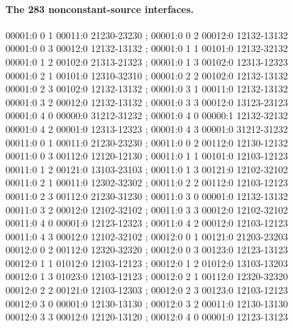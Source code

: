 \documentclass[11pt]{article}
\theoremstyle{remark}
\numberwithin{equation}{section}
\numberwithin{table}{section}
\begin{document}
\paragraph{The 283 nonconstant-source interfaces.}
\begingroup\scriptsize\ttfamily\begin{flushleft}
00001:0 0 1 00011:0 21230-23230 ; 00001:0 0 2 00012:0 12132-13132\\
00001:0 0 3 00012:0 12132-13132 ; 00001:0 1 1 00101:0 12132-32132\\
00001:0 1 2 00102:0 21313-21323 ; 00001:0 1 3 00102:0 12313-12323\\
00001:0 2 1 00101:0 12310-32310 ; 00001:0 2 2 00102:0 12132-13132\\
00001:0 2 3 00102:0 12132-13132 ; 00001:0 3 1 00011:0 12132-13132\\
00001:0 3 2 00012:0 12132-13132 ; 00001:0 3 3 00012:0 13123-23123\\
00001:0 4 0 00000:0 31212-31232 ; 00001:0 4 0 00000:1 12132-32132\\
00001:0 4 2 00001:0 12313-12323 ; 00001:0 4 3 00001:0 31212-31232\\
00011:0 0 1 00011:0 21230-23230 ; 00011:0 0 2 00112:0 12130-12132\\
00011:0 0 3 00112:0 12120-12130 ; 00011:0 1 1 00101:0 12103-12123\\
00011:0 1 2 00121:0 13103-23103 ; 00011:0 1 3 00121:0 12102-32102\\
00011:0 2 1 00011:0 12302-32302 ; 00011:0 2 2 00112:0 12103-12123\\
00011:0 2 3 00112:0 21230-31230 ; 00011:0 3 0 00001:0 12132-13132\\
00011:0 3 2 00012:0 12102-32102 ; 00011:0 3 3 00012:0 12102-32102\\
00011:0 4 0 00001:0 12123-12323 ; 00011:0 4 2 00012:0 12103-12123\\
00011:0 4 3 00012:0 12102-32102 ; 00012:0 0 1 00121:0 21203-23203\\
00012:0 0 2 00112:0 12320-32320 ; 00012:0 0 3 00123:0 12123-13123\\
00012:0 1 1 01012:0 12103-12123 ; 00012:0 1 2 01012:0 13103-13203\\
00012:0 1 3 01023:0 12103-12123 ; 00012:0 2 1 00112:0 12320-32320\\
00012:0 2 2 00121:0 12103-12303 ; 00012:0 2 3 00123:0 12103-12123\\
00012:0 3 0 00001:0 12130-13130 ; 00012:0 3 2 00011:0 12130-13130\\
00012:0 3 3 00012:0 12120-13120 ; 00012:0 4 0 00001:0 12123-13123\\

\end{flushleft}
\end{document}
